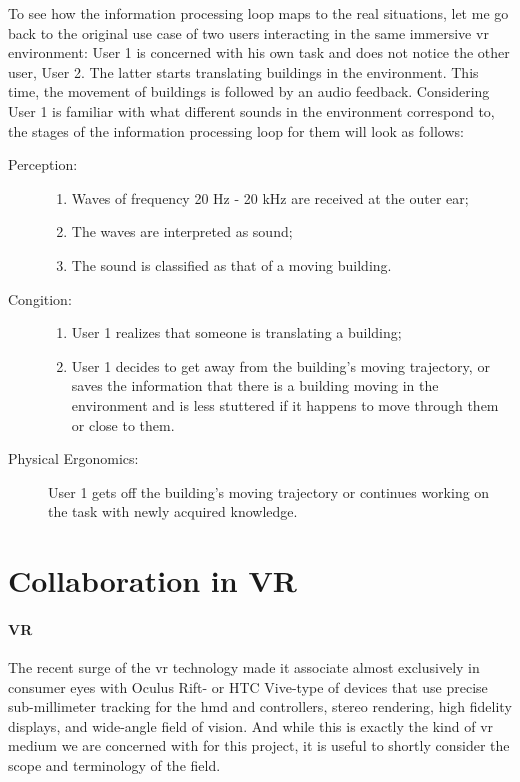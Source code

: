 To see how the information processing loop maps to the real situations, let me go back to the original use case of two users interacting in the same immersive \gls{vr} environment: User 1 is concerned with his own task and does not notice the other user, User 2. The latter starts translating buildings in the environment. This time, the movement of buildings is followed by an audio feedback.
Considering User 1 is familiar with what different sounds in the environment correspond to, the stages of the information processing loop for them will look as follows:
\begin{description}
	\item[Perception:] \hfill
		\begin{enumerate}
			\item Waves of frequency 20 Hz - 20 kHz are received at the outer ear;
			\item The waves are interpreted as sound;
			\item The sound is classified as that of a moving building.
		\end{enumerate}
	\item[Congition:] \hfill
		
		\begin{enumerate}
			\item User 1 realizes that someone is translating a building;
			\item User 1 decides to get away from the building's moving trajectory, or saves the information that there is a building moving in the environment and is less stuttered if it happens to move through them or close to them.
		\end{enumerate}
	\item[Physical Ergonomics:] \hfill
			
			User 1 gets off the building's moving trajectory or continues working on the task with newly acquired knowledge.
		
\end{description}

\section{Collaboration in VR}

\paragraph{VR}
The recent surge of the \gls{vr} technology made it associate almost exclusively in consumer eyes with Oculus Rift- or HTC Vive-type of devices that use precise sub-millimeter tracking for the \gls{hmd} and controllers, stereo rendering, high fidelity displays, and wide-angle field of vision. And while this is exactly the kind of \gls{vr} medium we are concerned with for this project, it is useful to shortly consider the scope and terminology of the field.


